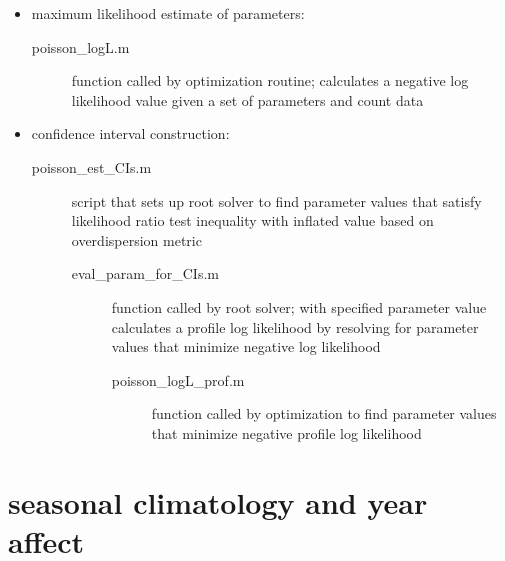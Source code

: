 \documentclass[11pt]{article}
\begin{document}

\begin{itemize}
\item maximum likelihood estimate of parameters:
\begin{description}
\item [poisson\_logL.m] function called by optimization routine; calculates a negative log likelihood value given a set of parameters and count data
\end{description}

\item confidence interval construction:
\begin{description}
\item [poisson\_est\_CIs.m] script that sets up root solver to find parameter values that satisfy likelihood ratio test inequality with inflated value based on overdispersion metric 
\begin{description}
\item [eval\_param\_for\_CIs.m] function called by root solver; with specified parameter value calculates a profile log likelihood by resolving for parameter values that minimize negative log likelihood
\begin{description}
\item [poisson\_logL\_prof.m] function called by optimization to find parameter values that minimize negative profile log likelihood
\end{description}
\end{description}
\end{description}
\end{itemize}


\section{seasonal climatology and year affect} 
\end{document}
